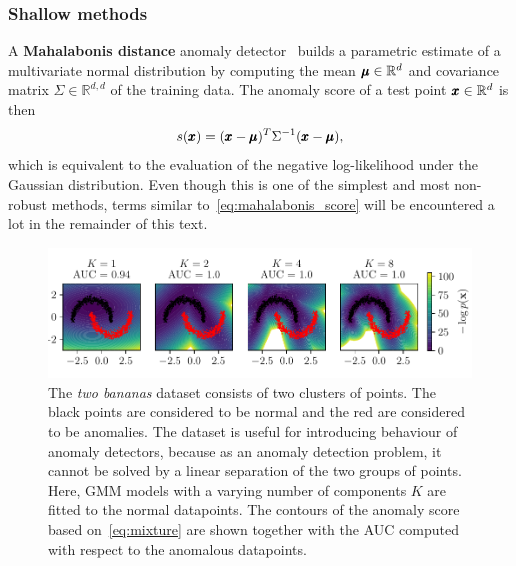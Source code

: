 \subsubsection{Shallow methods}
A \textbf{Mahalabonis distance} anomaly detector~\cite{laurikkala2000informal} builds a parametric estimate of a multivariate normal distribution by computing the mean $\pmb{{\mu}} \in \mathbb{R}^d$ and covariance matrix $\Sigma \in \mathbb{R}^{d,d}$ of the training data. The anomaly score of a test point $\pmb{{x}} \in \mathbb{R}^d$ is then
\begin{equation} \label{eq:mahalabonis_score}
	s(\pmb{{x}}) =  (\pmb{{x}} - \pmb{{\mu}}) ^T \Sigma ^{-1} (\pmb{{x}}-\pmb{{\mu}}),
\end{equation}
which is equivalent to the evaluation of the negative log-likelihood under the Gaussian distribution. Even though this is one of the simplest and most non-robust methods, terms similar to~\eqref{eq:mahalabonis_score} will be encountered a lot in the remainder of this text.

\begin{figure}
\begin{centering}
\includegraphics[scale=0.98]{data/chapter_intro/gmm_examples.pdf}
\end{centering}
\caption{The \textit{two bananas} dataset consists of two clusters of points. The black points are considered to be normal and the red are considered to be anomalies. The dataset is useful for introducing behaviour of anomaly detectors, because as an anomaly detection problem, it cannot be solved by a linear separation of the two groups of points. Here, GMM models with a varying number of components $K$ are fitted to the normal datapoints. The contours of the anomaly score based on~\eqref{eq:mixture} are shown together with the AUC computed with respect to the anomalous datapoints.}
\label{fig:gmm_examples}
\end{figure}

